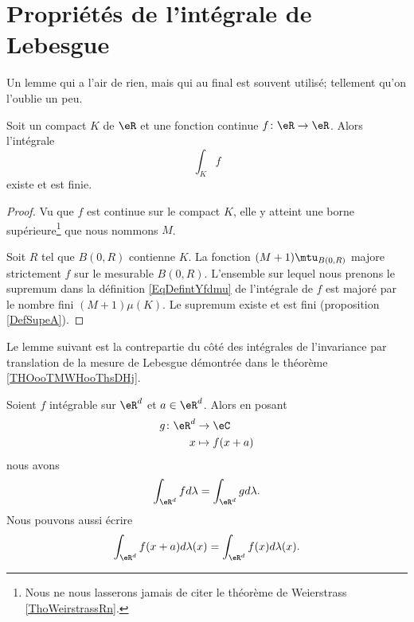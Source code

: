 
\section{Propriétés de l'intégrale de Lebesgue}

Un lemme qui a l'air de rien, mais qui au final est souvent utilisé; tellement qu'on l'oublie un peu.
\begin{lemma}       \label{LEMooWKSWooPptdEm}
	Soit un compact \( K\) de \( \eR\) et une fonction continue \( f\colon \eR\to \eR\). Alors l'intégrale
	\begin{equation}
		\int_Kf
	\end{equation}
	existe et est finie.
\end{lemma}

\begin{proof}
	Vu que \( f\) est continue sur le compact \( K\), elle y atteint une borne supérieure\footnote{Nous ne nous lasserons jamais de citer le théorème de Weierstrass \ref{ThoWeirstrassRn}.} que nous nommons \( M\).

	Soit \( R\) tel que \( B(0,R)\) contienne \( K\). La fonction \( (M+1)\mtu_{B(0,R)}\) majore strictement \( f\) sur le mesurable \( B(0,R)\). L'ensemble sur lequel nous prenons le supremum dans la définition \eqref{EqDefintYfdmu} de l'intégrale de \( f\) est majoré par le nombre fini \( (M+1)\mu(K)\). Le supremum existe et est fini (proposition \ref{DefSupeA}).
\end{proof}

Le lemme suivant est la contrepartie du côté des intégrales de l'invariance par translation de la mesure de Lebesgue démontrée dans le théorème \ref{THOooTMWHooThsDHj}.
\begin{lemma}       \label{LEMooGKOGooPLYaUO}
	Soient \( f\) intégrable sur \( \eR^d\) et \( a\in \eR^d\). Alors en posant
	\begin{equation}
		\begin{aligned}
			g\colon \eR^d & \to \eC        \\
			x             & \mapsto f(x+a)
		\end{aligned}
	\end{equation}
	nous avons
	\begin{equation}
		\int_{\eR^d}fd\lambda = \int_{\eR^d}gd\lambda.
	\end{equation}
	Nous pouvons aussi écrire
	\begin{equation}
		\int_{\eR^d}f(x+a)d\lambda(x)=\int_{\eR^d}f(x)d\lambda(x).
	\end{equation}
\end{lemma}


